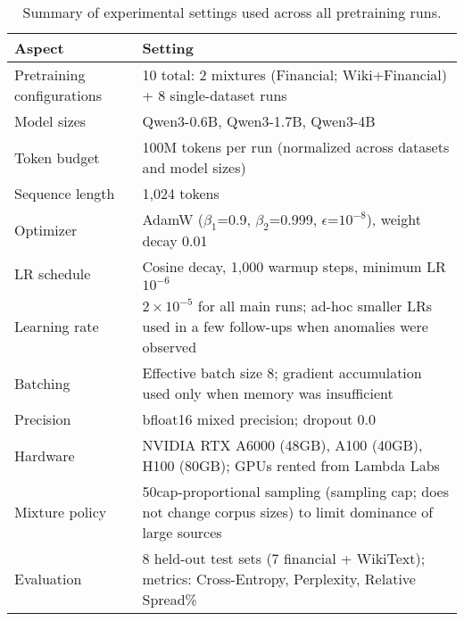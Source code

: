 \begin{table}[h]
\centering
\caption[Experimental Settings Summary]{Summary of experimental settings used across all pretraining runs.}
\label{tab:exp_settings}
\small
\begin{tabular}{p{3.8cm} p{9.5cm}}
\toprule
\textbf{Aspect} & \textbf{Setting} \\
\midrule
Pretraining configurations & 10 total: 2 mixtures (Financial; Wiki+Financial) + 8 single-dataset runs \\
Model sizes & Qwen3-0.6B, Qwen3-1.7B, Qwen3-4B \\
Token budget & 100M tokens per run (normalized across datasets and model sizes) \\
Sequence length & 1{,}024 tokens \\
Optimizer & AdamW ($\beta_1$=0.9, $\beta_2$=0.999, $\epsilon$=$10^{-8}$), weight decay 0.01 \\
LR schedule & Cosine decay, 1{,}000 warmup steps, minimum LR $10^{-6}$ \\
Learning rate & $2\times10^{-5}$ for all main runs; ad-hoc smaller LRs used in a few follow-ups when anomalies were observed \\
Batching & Effective batch size 8; gradient accumulation used only when memory was insufficient \\
Precision & bfloat16 mixed precision; dropout 0.0 \\
Hardware & NVIDIA RTX A6000 (48GB), A100 (40GB), H100 (80GB); GPUs rented from Lambda Labs \\
Mixture policy & 50cap-proportional sampling (sampling cap; does not change corpus sizes) to limit dominance of large sources \\
Evaluation & 8 held-out test sets (7 financial + WikiText); metrics: Cross-Entropy, Perplexity, Relative Spread\% \\
\bottomrule
\end{tabular}
\end{table}
